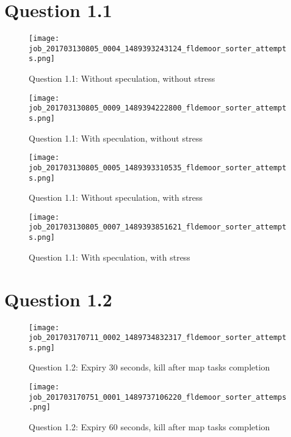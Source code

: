 \section{Question 1.1}

\begin{figure}[!ht]
    \centering
    \texttt{[image: job\_201703130805\_0004\_1489393243124\_fldemoor\_sorter\_attempts.png]}
    \caption{Question 1.1: Without speculation, without stress}
    \label{1.1.specOff.noStress}
\end{figure}
\newpage

\begin{figure}[!ht]
    \centering
    \texttt{[image: job\_201703130805\_0009\_1489394222800\_fldemoor\_sorter\_attempts.png]}
    \caption{Question 1.1: With speculation, without stress}
    \label{1.1.specOn.noStress}
\end{figure}

\begin{figure}[!ht]
    \centering
    \texttt{[image: job\_201703130805\_0005\_1489393310535\_fldemoor\_sorter\_attempts.png]}
    \caption{Question 1.1: Without speculation, with stress}
    \label{1.1.specOff.Stress}
\end{figure}
\newpage

\begin{figure}[!ht]
    \centering
    \texttt{[image: job\_201703130805\_0007\_1489393851621\_fldemoor\_sorter\_attempts.png]}
    \caption{Question 1.1: With speculation, with stress}
    \label{1.1.specOn.Stress}
\end{figure}
\newpage

\section{Question 1.2}

\begin{figure}[!ht]
    \centering
    \texttt{[image: job\_201703170711\_0002\_1489734832317\_fldemoor\_sorter\_attempts.png]}
    \caption{Question 1.2: Expiry 30 seconds, kill after map tasks completion}
    \label{1.2.30s.reduce}
\end{figure}
\newpage

\begin{figure}[!ht]
    \centering
    \texttt{[image: job\_201703170751\_0001\_1489737106220\_fldemoor\_sorter\_attemps.png]}
    \caption{Question 1.2: Expiry 60 seconds, kill after map tasks completion}
    \label{1.2.60s.reduce}
\end{figure}
\newpage

